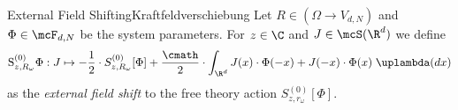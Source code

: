 \begin{mdef}{External Field Shifting}{Kraftfeldverschiebung}
    Let $R\in(\Omega\to V_{d,N})$ and $\Phi\in\mcF_{d,N}$ be the system parameters. For $z\in\C$ and $J\in\mcS(\R^d)$ we define
    \[
        \text{S}_{z,R_\omega}^{(0)}\Phi:J\mapsto -\frac{1}{2}\cdot S_{z,R_\omega}^{(0)}[\Phi] + \frac{\cmath}{2}\cdot\int_{\R^d} J(x)\cdot\Phi(-x) + J(-x)\cdot\Phi(x)\;\uplambda(dx)
    \]
    as the \emph{external field shift} to the free theory action $S_{z,r_\omega}^{(0)}[\Phi]$.
\end{mdef}
